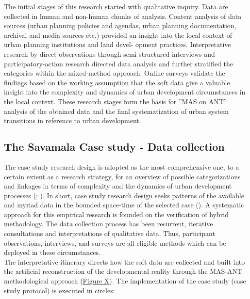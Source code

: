 \documentclass[11pt]{report}
\begin{document}
{{{{The initial stages of this research started with qualitative inquiry. Data are collected in human and non-human chunks of analysis. Content analysis of data sources (urban planning policies and agendas, urban planning documentation, archival and media sources etc.) provided an insight into the local context of urban planning institutions and land devel- opment practices. Interpretative research by direct observations through semi-structured interviews and participatory-action research directed data analysis and further stratified the categories within the mixed-method approach. Online surveys validate the findings based on the working assumption that the soft data give a valuable insight into the complexity and dynamics of urban development circumstances in the local context. These research stages form the basis for ”MAS on ANT” analysis of the obtained data and the final systematization of urban system transitions in reference to urban development.

\subsection{The Savamala Case study - Data collection} \label{sec:predis}

The case study research design is adopted as the most comprehensive one, to a certain extent as a research strategy, for an overview of possible categorizations and linkages in terms of complexity and the dynamics of urban development processes  (\href{Meredith}{\citealt{meredith_theory_1993}}; \href{Harrison}{\citealt{partington_case_2002}}). In short, case study research design seeks patterns of the available and myriad data in the bounded space-time of the selected case (\href{Denzin}{\citealt{denzin_research_2009}}). A systematic approach for this empirical research is founded on the verification of hybrid methodology. The data collection process has been recurrent, iterative consultations and interpretations of qualitative data. 
Thus, participant observations, interviews, and surveys are all eligible methods which can be deployed in these circumstances.
\\
The interpretative itinerary directs how the soft data are collected and built into the artificial reconstruction of the developmental reality through the MAS-ANT methodological approach (\href{Figure xxx}{Figure X}). The implementation of the case study (case study protocol) is executed in circles:

}}}}
\end{document}
